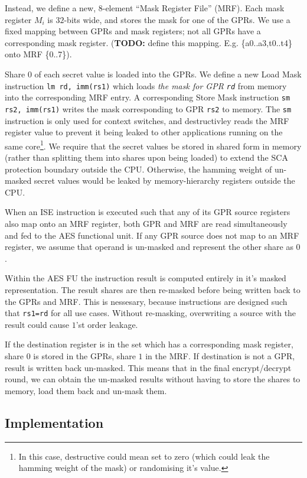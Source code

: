 Instead, we define a new, $8$-element ``Mask Register File'' (MRF).
Each mask register $M_i$ is $32$-bits wide, and stores the mask for
one of the GPRs.
We use a fixed mapping between GPRs and mask registers;
not all GPRs have a corresponding mask register.
({\bf TODO:} define this mapping. E.g. \{a0..a3,t0..t4\} onto MRF \{0..7\}).

Share $0$ of each secret value is loaded into the GPRs.
We define a new Load Mask instruction {\tt lm rd, imm(rs1)} which
loads {\em the mask for GPR {\tt rd}} from memory into the corresponding
MRF entry.
A corresponding Store Mask instruction {\tt sm rs2, imm(rs1)} writes
the mask corresponding to GPR {\tt rs2} to memory.
The {\tt sm} instruction is only used for context switches, and
destructivley reads the MRF register value to prevent it being
leaked to other applications running on the same core\footnote{
    In this case, destructive could mean set to zero (which could
    leak the hamming weight of the mask) or randomising it's value.}.
We require that the secret values be stored in shared form in memory
(rather than splitting them into shares upon being loaded)
to extend the SCA protection boundary outside the CPU.
Otherwise, the hamming weight of un-masked secret values would be
leaked by memory-hierarchy registers outside the CPU.

When an ISE instruction is executed such that any of its GPR source
registers also map onto an MRF register, both GPR and MRF are
read simultaneously and fed to the AES functional unit.
If any GPR source does not map to an MRF register, we assume that
operand is un-masked and represent the other share as $0$.

Within the AES FU the instruction result is computed entirely in it's
masked representation.
The result shares are then re-masked before being written back to the
GPRs and MRF.
This is nessesary, because  instructions are designed
such that {\tt rs1=rd} for all use cases.
Without re-masking, overwriting a source with the result could cause 
$1$'st order leakage.

If the destination register is in the set which has a corresponding
mask register, share $0$ is stored in the GPRs, share $1$ in the MRF.
If destination is not a GPR, result is written back un-masked.
This means that in the final encrypt/decrypt round, we can obtain
the un-masked results without having to store the shares to memory,
load them back and un-mask them.

\subsection{Implementation}

